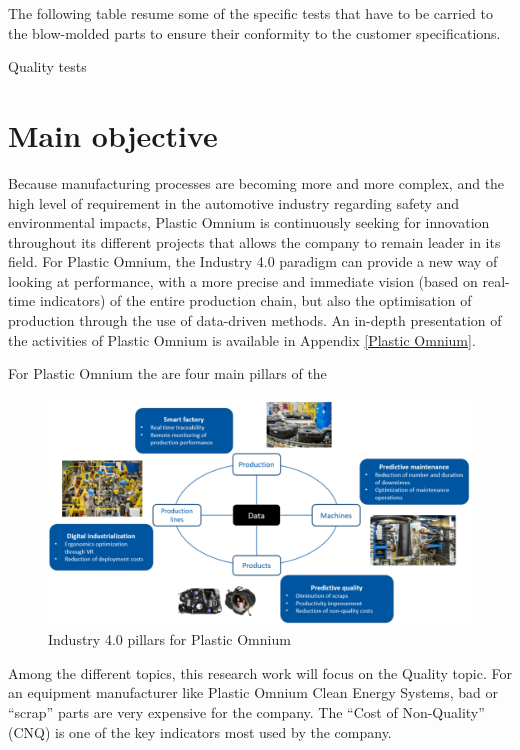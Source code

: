 The following table resume some of the specific tests that have to be carried to the blow-molded parts to ensure their conformity to the customer specifications.


\begin{table}[]

\caption{Quality tests}
\end{table}



\section{Main objective}

Because manufacturing processes are becoming more and more complex, and the high level of requirement in the automotive industry regarding safety and environmental impacts, Plastic Omnium is continuously seeking for innovation throughout its different projects that allows the company to remain leader in its field. For Plastic Omnium, the Industry 4.0 paradigm can provide a new way of looking at performance, with a more precise and immediate vision (based on real-time indicators) of the entire production chain, but also the optimisation of production through the use of data-driven methods. An in-depth presentation of the activities of Plastic Omnium is available in Appendix \ref{Plastic Omnium}.

For Plastic Omnium the are four main pillars of the 



\begin{figure}
\centerline{\includegraphics[scale=0.50]{images/chapter_1/Digitalisation_pillars.png}}
\caption{Industry 4.0 pillars for Plastic Omnium}
\label{fig:pillars}
\end{figure}


Among the different topics, this research work will focus on the Quality topic.
For an equipment manufacturer like Plastic Omnium Clean Energy Systems, bad or ``scrap'' parts are very expensive for the company. The “Cost of Non-Quality” (CNQ) is one of the key indicators most used by the company. 




